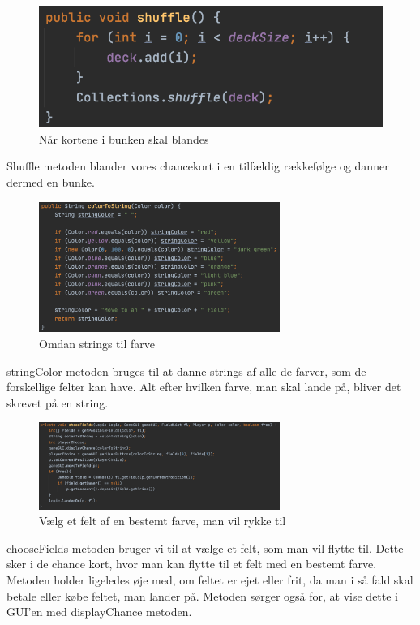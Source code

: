 \begin{figure}[H]
    \centering
    \includegraphics{sources/7_implementering/Controllershuffle.png}
    \caption{Når kortene i bunken skal blandes}
    \label{fig:shuffle}
\end{figure}
Shuffle metoden blander vores chancekort i en tilfældig rækkefølge og danner dermed en bunke.



\begin{figure}[H]
    \centering
    \includegraphics[width=0.7\textwidth]{sources/7_implementering/ControllercolortoString.png}
    \caption{Omdan strings til farve}
    \label{fig:colorString}
\end{figure}
stringColor metoden bruges til at danne strings af alle de farver, som de forskellige felter kan have. Alt efter hvilken farve, man skal lande på, bliver det skrevet på en string.



\begin{figure}[H]
    \centering
    \includegraphics[width=0.7\textwidth]{sources/7_implementering/ControllerchooseFields.png}
    \caption{Vælg et felt af en bestemt farve, man vil rykke til}
    \label{fig:chooseFields}
\end{figure}
chooseFields metoden bruger vi til at vælge et felt, som man vil flytte til. Dette sker i de chance kort, hvor man kan flytte til et felt med en bestemt farve. Metoden holder ligeledes øje med, om feltet er ejet eller frit, da man i så fald skal betale eller købe feltet, man lander på. Metoden sørger også for, at vise dette i GUI’en med displayChance metoden.



